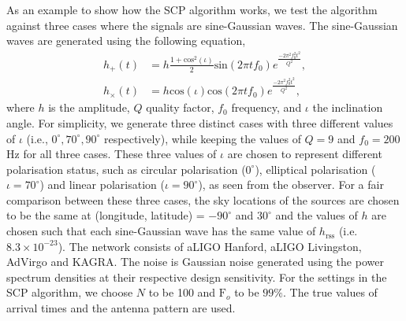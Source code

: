 \documentclass[aps,twocolumn,showpacs,groupedaddress, nofootinbib]{revtex4}  %
\begin{document}
As an example to show how the \ac{SCP} algorithm works, we test the algorithm against three cases where the signals are sine-Gaussian waves.
The sine-Gaussian waves are generated using the following equation,
\begin{align}\label{eq:singau}
 h_{+}(t) &= h\frac{1 + \text{cos}^2(\iota)}{2}\text{sin}(2\pi t f_0) e^{\frac{-2 \pi^2  f^2_0 t^2 }{Q^2}},\nonumber \\
 h_{\times}(t) &= h \text{cos}(\iota)\text{cos}(2\pi t f_0) e^{\frac{-2 \pi^2  f^2_0 t^2 }{Q^2}},
\end{align}
where $h$ is the amplitude, $Q$ quality factor, $f_0$  frequency, and $\iota$ the inclination angle.
For simplicity, we generate three distinct cases with three different values of $\iota$ (i.e., $0^{\circ}, 70^{\circ}, 90^{\circ}$ respectively), 
while keeping the values of $Q = 9$ and  $f_0 = 200$Hz for all three cases.
These three values of $\iota$ are chosen to represent different polarisation status, such as circular polarisation ($0^{\circ}$), 
elliptical polarisation ($\iota = 70^{\circ}$) and linear polarisation ($\iota = 90^{\circ}$), as seen from the observer.
For a fair comparison between these three cases, the sky locations of the sources are chosen to be the same at (longitude, latitude) = $-90^\circ$ and $30^\circ$ and 
the values of $h$ are chosen  such that each sine-Gaussian wave has the same value of $h_\text{rss}$ (i.e. $8.3\times10^{-23}$).
The network consists of \ac{aLIGO} Hanford, \ac{aLIGO} Livingston, \ac{AdVirgo} and KAGRA. 
The noise is Gaussian noise generated using the power spectrum densities at their respective design sensitivity.
For the settings in the \ac{SCP} algorithm, we choose $N$ to be 100 and $\text{F}_o$ to be $99\%$. 
The true values of arrival times and the antenna pattern are used.
\end{document}
